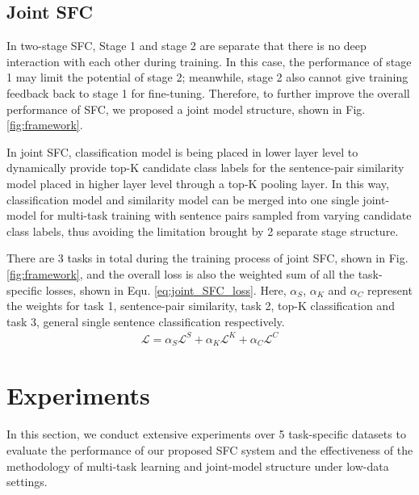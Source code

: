 \documentclass[letterpaper]{article} %
\begin{document}
  \subsection{Joint SFC}
  In  two-stage  SFC,  Stage  1  and  stage 2 are separate that there is no deep
  interaction  with each other during training. In this case, the performance of
  stage  1  may  limit  the potential of stage 2; meanwhile, stage 2 also cannot
  give  training feedback back to stage 1 for fine-tuning. Therefore, to further
  improve  the  overall performance of SFC, we proposed a joint model structure,
  shown in Fig. \ref{fig:framework}.

  In  joint  SFC,  classification  model is being placed in lower layer level to
  dynamically  provide  top-K  candidate  class  labels  for  the  sentence-pair
  similarity  model  placed in higher layer level through a top-K pooling layer.
  In  this way, classification model and similarity model can be merged into one
  single  joint-model  for  multi-task training with sentence pairs sampled from
  varying  candidate  class  labels,  thus  avoiding the limitation brought by 2
  separate stage structure.

  There  are 3 tasks in total during the training process of joint SFC, shown in
  Fig. \ref{fig:framework}, and the overall loss is also the weighted sum of all
  the   task-specific  losses,  shown  in  Equ.  \ref{eq:joint_SFC_loss}.  Here,
  $\alpha_S$,   $\alpha_K$   and   $\alpha_C$   represent the  weights  for  task  1,
  sentence-pair  similarity,  task  2,  top-K classification and task 3, general
  single sentence classification respectively.
  \begin{align}
    \mathcal{L} = \alpha_S \mathcal{L}^S + \alpha_K \mathcal{L}^K + \alpha_C \mathcal{L}^C
    \label{eq:joint_SFC_loss}
  \end{align}

  \section{Experiments}
  \label{sec:exp}
  
  In  this  section,  we  conduct  extensive  experiments  over  5 task-specific
  datasets  to  evaluate  the  performance  of  our  proposed SFC system and the
  effectiveness  of  the  methodology  of  multi-task  learning  and
  joint-model structure under low-data settings.
\end{document}

